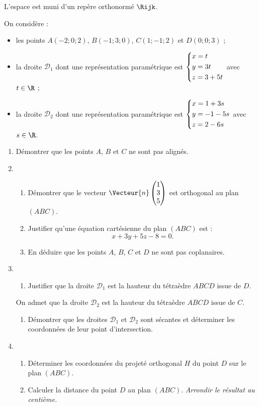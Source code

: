 L'espace est muni d'un repère orthonormé $\Rijk$.

On considère :

\begin{itemize}
	\item les points $A(-2;0;2)$, $B(-1;3;0)$, $C(1;-1;2)$ et $D(0;0;3)$ ;
	\item la droite $\mathcal{D}_1$ dont une représentation paramétrique est $\begin{dcases}x=t\\y=3t\\z=3+5t\end{dcases}$ avec $t \in \R$ ;
	\item la droite $\mathcal{D}_2$ dont une représentation paramétrique est $\begin{dcases}x=1+3s\\y=-1-5s\\z=2-6s\end{dcases}$ avec $s \in \R$.
\end{itemize}

\begin{enumerate}
	\item Démontrer que les points $A$, $B$ et $C$ ne sont pas alignés.
	\item 
	\begin{enumerate}
		\item Démontrer que le vecteur $\Vecteur{n}\begin{pmatrix}1\\3\\5\end{pmatrix}$ est orthogonal au plan $(ABC)$.
		\item Justifier qu'une équation cartésienne du plan $(ABC)$ est : \[ x+3y+5z-8=0. \]
		\item En déduire que les points $A$, $B$, $C$ et $D$ ne sont pas coplanaires.
	\end{enumerate}
	\item 
	\begin{enumerate}
		\item Justifier que la droite $\mathcal{D}_1$ est la hauteur du tétraèdre $ABCD$ issue de $D$.
	\end{enumerate}
	On admet que la droite $\mathcal{D}_2$ est la hauteur du tétraèdre $ABCD$ issue de $C$.
	\begin{enumerate}[resume]
		\item Démontrer que les droites $\mathcal{D}_1$ et $\mathcal{D}_2$ sont sécantes et déterminer les coordonnées de leur point d'intersection.
	\end{enumerate}
	\item 
	\begin{enumerate}
		\item Déterminer les coordonnées du projeté orthogonal $H$ du point $D$ sur le plan $(ABC)$.
		\item Calculer la distance du point $D$ au plan $(ABC)$. \textit{Arrondir le résultat au centième.}
	\end{enumerate}
\end{enumerate}